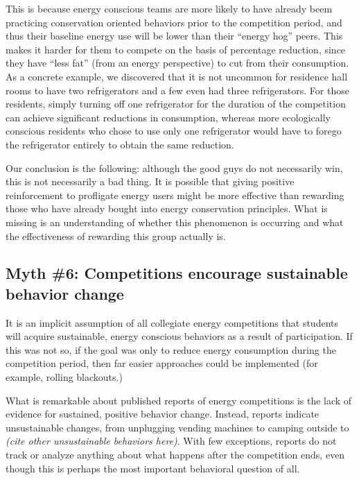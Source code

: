 \documentclass[jou]{apa} %
\begin{document}
This is because energy conscious teams are more likely to have already beem practicing 
conservation oriented behaviors prior to the competition period, and thus
their baseline energy use will be lower than their ``energy hog'' peers.  This makes it
harder for them to compete on the basis of percentage reduction, since they have ``less
fat'' (from an energy perspective) to cut from their consumption.  As a concrete example, we
discovered that it is not uncommon for residence hall rooms to have two refrigerators and
a few even had three refrigerators. For those residents, simply turning off one
refrigerator for the duration of the competition can achieve significant reductions in
consumption, whereas more ecologically conscious residents who chose to use only one
refrigerator would have to forego the refrigerator entirely to obtain the same reduction.

Our conclusion is the following: although the good guys do not necessarily win, this is
not necessarily a bad thing. It is possible that giving positive reinforcement to
profligate energy users might be more effective than rewarding those who have already
bought into energy conservation principles. What is missing is an understanding of whether
this phenomenon is occurring and what the effectiveness of rewarding this group actually is.


\subsection{Myth \#6: Competitions encourage sustainable behavior change}


It is an implicit assumption of all collegiate energy competitions that students will acquire
sustainable, energy conscious behaviors as a result of participation.  If this was not so,
if the goal was only to reduce energy consumption during the competition period, then far
easier approaches could be implemented (for example, rolling blackouts.)

What is remarkable about published reports of energy competitions is the lack of evidence
for sustained, positive behavior change. Instead, reports indicate unsustainable changes,
from unplugging vending machines \cite{Petersen07a} to camping outside \cite{Hodge2010} to 
{\em (cite other unsustainable behaviors here)}.   With few exceptions, reports do not
track or analyze anything about what happens after the competition ends, even though this
is perhaps the most important behavioral question of all.  
\end{document}
